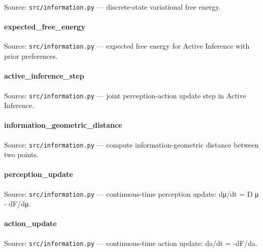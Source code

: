\documentclass[
  10pt,
]{article}
\newcommand{\passthrough}[1]{#1}
\renewcommand{\texttt}[1]{%
    \colorbox{codebg}{\color{codefg}\ttfamily #1}%
}
\begin{document}
Source: \passthrough{\lstinline!src/information.py!} --- discrete-state
variational free energy.

\hypertarget{code:expected_free_energy}{%
\paragraph{\texorpdfstring{\texttt{expected\_free\_energy}}{expected\_free\_energy}}\label{code:expected_free_energy}}

Source: \passthrough{\lstinline!src/information.py!} --- expected free
energy for Active Inference with prior preferences.

\hypertarget{code:active_inference_step}{%
\paragraph{\texorpdfstring{\texttt{active\_inference\_step}}{active\_inference\_step}}\label{code:active_inference_step}}

Source: \passthrough{\lstinline!src/information.py!} --- joint
perception-action update step in Active Inference.

\hypertarget{code:information_geometric_distance}{%
\paragraph{\texorpdfstring{\texttt{information\_geometric\_distance}}{information\_geometric\_distance}}\label{code:information_geometric_distance}}

Source: \passthrough{\lstinline!src/information.py!} --- compute
information-geometric distance between two points.

\hypertarget{code:perception_update}{%
\paragraph{\texorpdfstring{\texttt{perception\_update}}{perception\_update}}\label{code:perception_update}}

Source: \passthrough{\lstinline!src/information.py!} --- continuous-time
perception update: dμ/dt = D μ - dF/dμ.

\hypertarget{code:action_update}{%
\paragraph{\texorpdfstring{\texttt{action\_update}}{action\_update}}\label{code:action_update}}

Source: \passthrough{\lstinline!src/information.py!} --- continuous-time
action update: da/dt = -dF/da.
\end{document}
